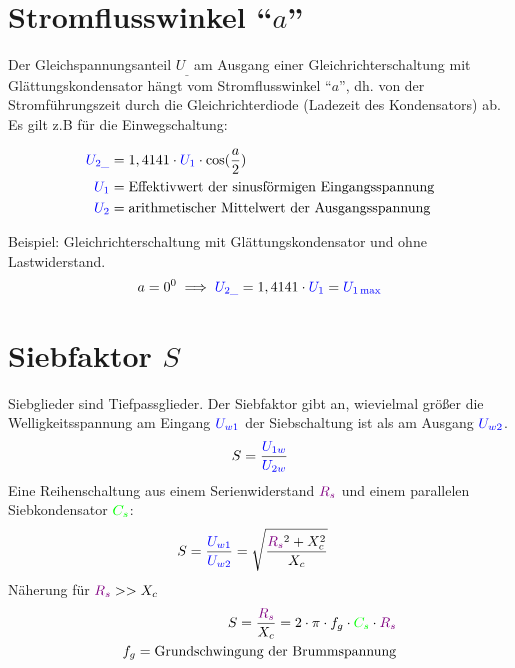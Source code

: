 \documentclass[11pt,a4paper,titlepage]{scrreprt}
\begin{document}
           \section{Stromflusswinkel "`$a$"'}
           Der  Gleichspannungsanteil  $U_{\_}$  am  Ausgang  einer  Gleichrichterschaltung  mit  Glättungskondensator hängt vom Stromflusswinkel "`$a$"', dh. von der Stromführungszeit durch die Gleichrichterdiode (Ladezeit des Kondensators) ab. Es gilt z.B für die Einwegschaltung:
           
           \begin{align*}
           \textcolor{blue}{U_{2\_}} &= 1,4141 \cdot \textcolor{blue}{U_1} \cdot \cos(\frac{a}{2})\\
           \textcolor{blue}{U_1}&= \text{Effektivwert der sinusförmigen Eingangsspannung}\\
           \textcolor{blue}{U_2}&= \text{arithmetischer Mittelwert der Ausgangsspannung}\\
           \end{align*}
           
           Beispiel: Gleichrichterschaltung mit Glättungskondensator und ohne Lastwiderstand.
           \begin{equation*}
           a = 0^0 \implies \textcolor{blue}{U_{2\_}} = 1,4141 \cdot \textcolor{blue}{U_1} = \textcolor{blue}{U_{1\max}}
           \end{equation*}
           \section{Siebfaktor $S$}
           Siebglieder sind Tiefpassglieder. Der Siebfaktor gibt an, wievielmal größer die Welligkeitsspannung am Eingang $\textcolor{blue}{U_{w1}}$ der Siebschaltung ist als am Ausgang $\textcolor{blue}{U_{w2}}$.
           \begin{equation*}
           S = \frac{\textcolor{blue}{U_{1w}}}{\textcolor{blue}{U_{2w}}}
           \end{equation*}
           Eine Reihenschaltung aus einem Serienwiderstand $\textcolor{violet}{R_s}$ und einem parallelen Siebkondensator $\textcolor{green}{C_s}$:
           \begin{align*}
            S &= \frac{\textcolor{blue}{U_{w1}}}{\textcolor{blue}{U_{w2}}} = \sqrt{\frac{\textcolor{violet}{R_s}^2 + X_c^2}{X_c}}
           \end{align*}
           Näherung für $\textcolor{violet}{R_s} >> X_c$
           \begin{align*}
           S = \frac{\textcolor{violet}{R_s}}{X_c} = 2 \cdot \pi \cdot f_g \cdot \textcolor{green}{C_s} \cdot \textcolor{violet}{R_s}\\
           f_g = \text{Grundschwingung der Brummspannung}
           \end{align*}
           
\end{document}
